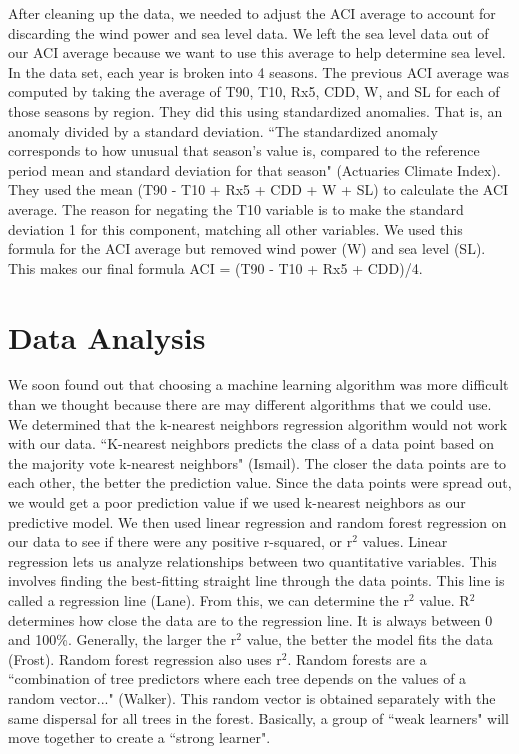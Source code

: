 \documentclass[12pt]{report}
\begin{document}
		\par After cleaning up the data, we needed to adjust the ACI average to account for discarding the wind power and sea level data. We left the sea level data out of our ACI average because we want to use this average to help determine sea level. In the data set, each year is broken into 4 seasons. The previous ACI average was computed by taking the average of T90, T10, Rx5, CDD, W, and SL for each of those seasons by region. They did this using standardized anomalies. That is, an anomaly divided by a standard deviation. \textquotedblleft The standardized anomaly corresponds to how unusual that season's value is, compared to the reference period mean and standard deviation for that season" (Actuaries Climate Index). They used the mean (T90 - T10 + Rx5 + CDD + W + SL) to calculate the ACI average. The reason for negating the T10 variable is to make the standard deviation 1 for this component, matching all other variables. We used this formula for the ACI average but removed wind power (W) and sea level (SL). This makes our final formula ACI = (T90 - T10 + Rx5 + CDD)/4.
		
\section* {Data Analysis} 
		
\indent	\par We soon found out that choosing a machine learning algorithm was more difficult than we thought because there are may different algorithms that we could use. We determined that the k-nearest neighbors regression algorithm would not work with our data. \textquotedblleft K-nearest neighbors predicts the class of a data point based on the majority vote k-nearest neighbors" (Ismail). The closer the data points are to each other, the better the prediction value. Since the data points were spread out, we would get a poor prediction value if we used k-nearest neighbors as our predictive model. We then used linear regression and random forest regression on our data to see if there were any positive r-squared, or r$^2$ values. Linear regression lets us analyze relationships between two quantitative variables. This involves finding the best-fitting straight line through the data points. This line is called a regression line (Lane). From this, we can determine the r$^2$ value. R$^2$ determines how close the data are to the regression line. It is always between 0 and 100\%. Generally, the larger the r$^2$ value, the better the model fits the data (Frost). Random forest regression also uses r$^2$. Random forests are a  \textquotedblleft combination of tree predictors where each tree depends on the values of a random vector..." (Walker). This random vector is obtained separately with the same dispersal for all trees in the forest. Basically, a group of \textquotedblleft weak learners" will move together to create a \textquotedblleft strong learner".
\end{document}
